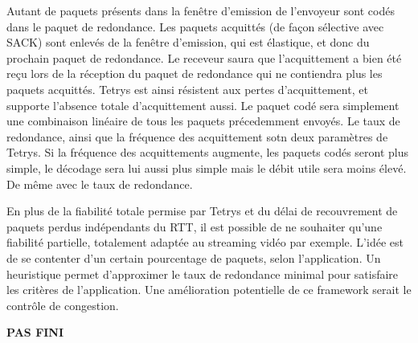 \documentclass[frenchb]{article}
\begin{document}
Autant de paquets présents dans la fenêtre d'emission de l'envoyeur sont codés dans le paquet de redondance. Les paquets acquittés (de façon sélective avec SACK) sont enlevés de la fenêtre d'emission, qui est élastique, et donc du prochain paquet de redondance. Le receveur saura que l'acquittement a bien été reçu lors de la réception du paquet de redondance qui ne contiendra plus les paquets acquittés.
Tetrys est ainsi résistent aux pertes d'acquittement, et supporte l'absence totale d'acquittement aussi. Le paquet codé sera simplement une combinaison linéaire de tous les paquets précedemment envoyés.
Le taux de redondance, ainsi que la fréquence des acquittement sotn deux paramètres de Tetrys. Si la fréquence des acquittements augmente, les paquets codés seront plus simple, le décodage sera lui aussi plus simple mais le débit utile sera moins élevé. De même avec le taux de redondance.

En plus de la fiabilité totale permise par Tetrys et du délai de recouvrement de paquets perdus indépendants du RTT, il est possible de ne souhaiter qu'une fiabilité partielle, totalement adaptée au streaming vidéo par exemple. L'idée est de se contenter d'un certain pourcentage de paquets, selon l'application. Un heuristique permet d'approximer le taux de redondance minimal pour satisfaire les critères de l'application.
Une amélioration potentielle de ce framework serait le contrôle de congestion.










\textbf{PAS FINI}
\end{document}
